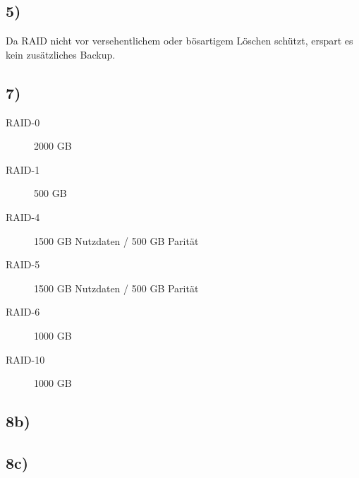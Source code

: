 \documentclass[ngerman]{fbi-aufgabenblatt}
\begin{document}
\subsection*{5)}
Da RAID nicht vor versehentlichem oder bösartigem Löschen schützt, erspart es kein zusätzliches Backup.

\subsection*{7)}
\begin{description}
	\item[RAID-0] 2000 GB
	\item [RAID-1] 500 GB
	\item [RAID-4] 1500 GB Nutzdaten / 500 GB Parität
	\item [RAID-5] 1500 GB Nutzdaten / 500 GB Parität
	\item [RAID-6] 1000 GB
	\item[RAID-10] 1000 GB
\end{description} 

\subsection*{8b)}

\subsection*{8c)}
\end{document}
